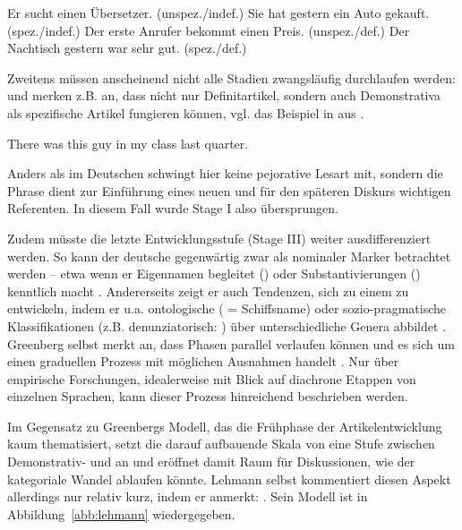 \begin{exe}
	\ex \label{ex:spez-ortho}   
	\begin{xlist}
		\ex \label{ex:kleid1} Er sucht einen Übersetzer.  (unspez./indef.) 
		\ex \label{ex:kleid2} Sie hat gestern ein Auto gekauft. (spez./indef.)
		\ex \label{ex:stud1} Der erste Anrufer bekommt einen Preis. (unspez./def.)
		\ex \label{ex:stud2} Der Nachtisch gestern war sehr gut. (spez./def.)
		\end{xlist}
\end{exe}

\noindent 
Zweitens müssen anscheinend nicht alle Stadien zwangsläufig durchlaufen werden: \textcite[107]{Himmelmann1997} und \textcite[139]{Diessel1999} merken z.B. an, dass nicht nur Definitartikel, sondern auch Demonstrativa  als spezifische  Artikel fungieren können, vgl. das Beispiel in  aus \textcite[533]{deMulder2011}. 
\begin{exe}
	\ex \label{ex:guy}   There was this guy in my class last quarter.
\end{exe}
\noindent 
Anders als im Deutschen schwingt hier keine pejorative Lesart mit, sondern die Phrase  dient zur Einführung eines neuen und für den späteren Diskurs wichtigen Referenten. In diesem Fall wurde Stage I also übersprungen. 

Zudem müsste die letzte Entwicklungsstufe (Stage III) weiter ausdifferenziert werden. So kann der deutsche  gegenwärtig zwar als nominaler Marker  betrachtet werden -- etwa wenn er Eigennamen  begleitet () oder Substantivierungen  () kenntlich macht \parencite[71]{Szczepaniak2011a}. Andererseits zeigt er auch Tendenzen, sich zu einem  zu entwickeln, indem er u.a. ontologische ( = Schiffsname) oder sozio-pragmatische Klassifikationen (z.B. denunziatorisch: ) über unterschiedliche Genera  abbildet \parencite{Nubling2014}. Greenberg selbst merkt an, dass Phasen parallel verlaufen können und es sich um einen graduellen Prozess mit möglichen Ausnahmen handelt \parencite[61]{Greenberg1978}. Nur über empirische Forschungen, idealerweise mit Blick auf diachrone Etappen von einzelnen Sprachen, kann dieser Prozess hinreichend beschrieben werden. 

Im Gegensatz zu Greenbergs Modell, das die Frühphase der Artikelentwicklung kaum thematisiert, setzt die darauf aufbauende Skala  von \textcite{Lehmann2015} eine Stufe zwischen  Demonstrativ-  und  an und eröffnet damit Raum für Diskussionen, wie der kategoriale Wandel ablaufen könnte. Lehmann selbst kommentiert diesen Aspekt allerdings nur relativ kurz, indem er anmerkt: \parencite[41]{Lehmann2015}. Sein Modell ist in Abbildung~\ref{abb:lehmann} wiedergegeben. 

